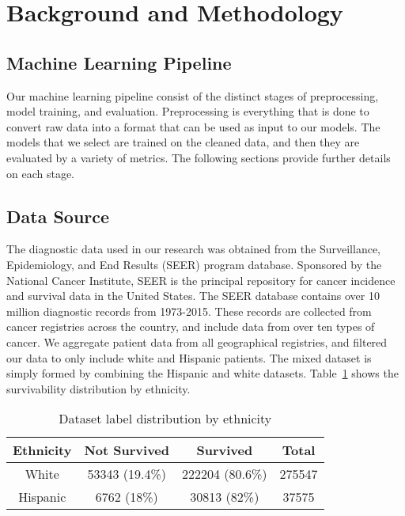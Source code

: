 \documentclass[review]{elsarticle}
\begin{document}
\section{Background and Methodology}

\subsection*{Machine Learning Pipeline}
Our machine learning pipeline consist of the distinct stages of preprocessing, model training, and evaluation. Preprocessing is everything that is done to convert raw data into a format that can be used as input to our models. The models that we select are trained on the cleaned data, and then they are evaluated by a variety of metrics. The following sections provide further details on each stage.
\subsection*{Data Source}
The diagnostic data used in our research was obtained from the Surveillance, Epidemiology, and End Results (SEER) program database\cite{seer-dataset}. Sponsored by the National Cancer Institute, SEER is the principal repository for cancer incidence and survival data in the United States. The SEER database contains over 10 million diagnostic records from 1973-2015. These records are collected from cancer registries across the country, and include data from over ten types of cancer. We aggregate patient data from all geographical registries, and filtered our data to only include white and Hispanic patients. The mixed dataset is simply formed by combining the Hispanic and white datasets. Table~\ref{dataset-info} shows the survivability distribution by ethnicity.

\begin{table}[H]
	\centering
	
	\begin{tabular}{cccc}
		\textbf{Ethnicity} & \textbf{Not Survived} & \textbf{Survived} & \textbf{Total} \\ 
		\hline
		White              & 53343 (19.4\%)   & 222204 (80.6\%)        &  275547  \\
		Hispanic           & 6762 (18\%)       & 30813 (82\%)           &  37575 \\
	\end{tabular}
	\caption{Dataset label distribution by ethnicity}
	\label{dataset-info}
\end{table}
\end{document}
